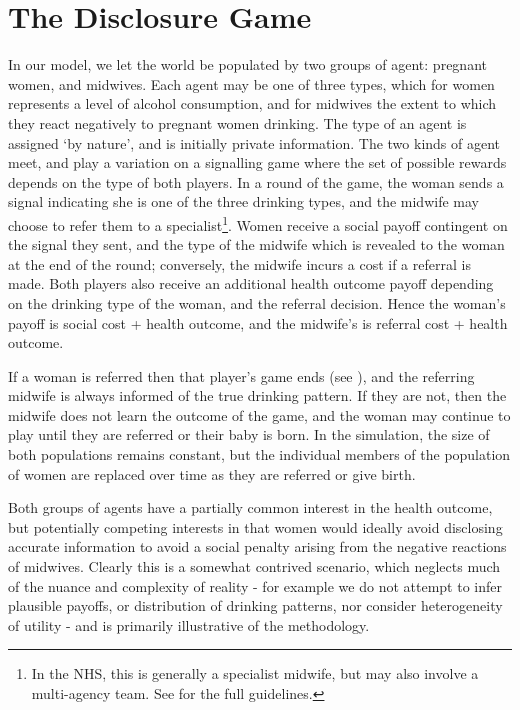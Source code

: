 \documentclass[twocolumn]{article}
\begin{document}
\section{The Disclosure Game}\label{case} %


In our model, we let the world be populated by two groups of agent: pregnant women, and midwives. Each agent may be one of three types, which for women represents a level of alcohol consumption, and for midwives the extent to which they react negatively to pregnant women drinking. The type of an agent is assigned `by nature', and is initially private information. The two kinds of agent meet, and play a variation on a signalling game \citep{Kreps1987} where the set of possible rewards depends on the type of both players. In a round of the game, the woman sends a signal indicating she is one of the three drinking types, and the midwife may choose to refer them to a specialist\footnote{In the NHS, this is generally a specialist midwife, but may also involve a multi-agency team. See \citet{NICE2010} for the full guidelines.}. Women receive a social payoff contingent on the signal they sent, and the type of the midwife which is revealed to the woman at the end of the round; conversely, the midwife incurs a cost if a referral is made. Both players also receive an additional health outcome payoff depending on the drinking type of the woman, and the referral decision. Hence the woman's payoff is social cost + health outcome, and the midwife's is referral cost + health outcome.

If a woman is referred then that player's game ends (see \citep{NICE2010}), and the referring midwife is always informed of the true drinking pattern. If they are not, then the midwife does not learn the outcome of the game, and the woman may continue to play until they are referred or their baby is born. In the simulation, the size of both populations remains constant, but the individual members of the population of women are replaced over time as they are referred or give birth.

Both groups of agents have a partially common interest in the health outcome, but potentially competing interests in that women would ideally avoid disclosing accurate information to avoid a social penalty arising from the negative reactions of midwives. Clearly this is a somewhat contrived scenario, which neglects much of the nuance and complexity of reality - for example we do not attempt to infer plausible payoffs, or distribution of drinking patterns, nor consider heterogeneity of utility - and is primarily illustrative of the methodology. 
\end{document}
